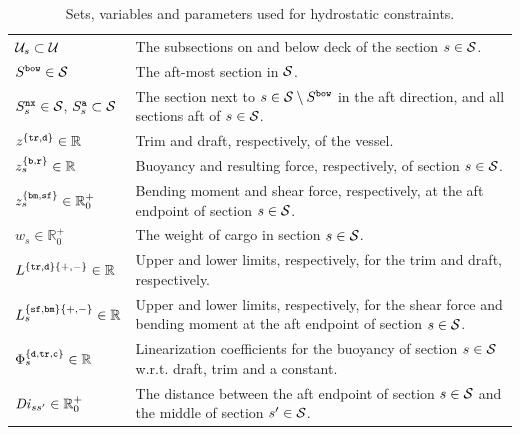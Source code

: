 \begin{table}
\centering
\btsize
\begin{tabular}{lp{10cm}}
$\mathcal{U}_s\subset\mathcal{U}$															& The subsections on and below deck of the section $s\in\mathcal{S}$.\\
$S^\texttt{bow}\in\mathcal{S}$															& The aft-most section in $\mathcal{S}$.\\
$S^\texttt{nx}_s\in\mathcal{S}$, $S^\texttt{a}_s\subset\mathcal{S}$	& The section next to $s\in\mathcal{S}\setminus S^\texttt{bow}$ in the aft direction, and all sections aft of $s\in\mathcal{S}$.\\
\hline
$z^{\{\texttt{tr},\texttt{d}\}}\in\mathbb{R}$ 						&	Trim and draft, respectively, of the vessel.\\
$z^{\{\texttt{b},\texttt{r}\}}_{s}\in \mathbb{R}$					&	Buoyancy and resulting force, respectively, of section $s\in\mathcal{S}$.\\
$z^{\{\texttt{bm},\texttt{sf}\}}_{s}\in \mathbb{R}^+_0$		&	Bending moment and shear force, respectively, at the aft endpoint of section $s\in\mathcal{S}$.\\
$w_{s} \in\mathbb{R}^+_0$														&	The weight of cargo in section $s\in\mathcal{S}$.\\
\hline
$L^{\{\texttt{tr},\texttt{d}\}\{+,-\}}\in\mathbb{R}$					& Upper and lower limits, respectively, for the trim and draft, respectively.\\
$L^{\{\texttt{sf},\texttt{bm}\}\{+,-\}}_{s}\in\mathbb{R}$			& Upper and lower limits, respectively, for the shear force and bending moment at the aft endpoint of section $s\in\mathcal{S}$.\\
$\Phi^{\{\texttt{d},\texttt{tr},\texttt{c}\}}_{s}\in\mathbb{R}$	& Linearization coefficients for the buoyancy of section $s\in \mathcal{S}$ w.r.t. draft, trim and a constant.\\
$\mathit{Di}_{ss'}\in \mathbb{R}^+_0$												& The distance between the aft endpoint of section $s\in\mathcal{S}$ and the middle of section $s'\in\mathcal{S}$.\\
\end{tabular}
\etsize
\caption{Sets, variables and parameters used for hydrostatic constraints.}\label{tab:hydro}
\end{table}

